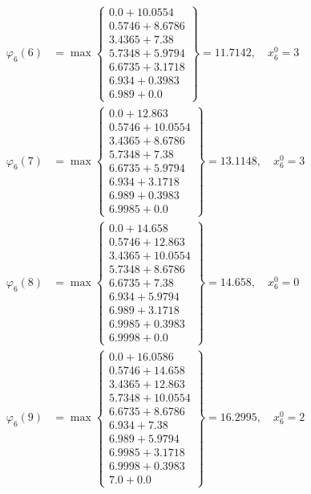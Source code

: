 \documentclass{article}
\begin{document}
\begin{align*}
  
  
  
\varphi_{6}(6) &= \max \left\{ \begin{array}{c}
0.0 + 10.0554 \\
 0.5746 + 8.6786 \\
 3.4365 + 7.38 \\
 5.7348 + 5.9794 \\
 6.6735 + 3.1718 \\
 6.934 + 0.3983 \\
 6.989 + 0.0
\end{array} \right\}=11.7142,\quad x_{6}^0=3\\
  
  
  
  
\varphi_{6}(7) &= \max \left\{ \begin{array}{c}
0.0 + 12.863 \\
 0.5746 + 10.0554 \\
 3.4365 + 8.6786 \\
 5.7348 + 7.38 \\
 6.6735 + 5.9794 \\
 6.934 + 3.1718 \\
 6.989 + 0.3983 \\
 6.9985 + 0.0
\end{array} \right\}=13.1148,\quad x_{6}^0=3\\
  
  
  
  
\varphi_{6}(8) &= \max \left\{ \begin{array}{c}
0.0 + 14.658 \\
 0.5746 + 12.863 \\
 3.4365 + 10.0554 \\
 5.7348 + 8.6786 \\
 6.6735 + 7.38 \\
 6.934 + 5.9794 \\
 6.989 + 3.1718 \\
 6.9985 + 0.3983 \\
 6.9998 + 0.0
\end{array} \right\}=14.658,\quad x_{6}^0=0\\
  
  
  
  
\varphi_{6}(9) &= \max \left\{ \begin{array}{c}
0.0 + 16.0586 \\
 0.5746 + 14.658 \\
 3.4365 + 12.863 \\
 5.7348 + 10.0554 \\
 6.6735 + 8.6786 \\
 6.934 + 7.38 \\
 6.989 + 5.9794 \\
 6.9985 + 3.1718 \\
 6.9998 + 0.3983 \\
 7.0 + 0.0
\end{array} \right\}=16.2995,\quad x_{6}^0=2\\
  

\end{align*}
\end{document}
